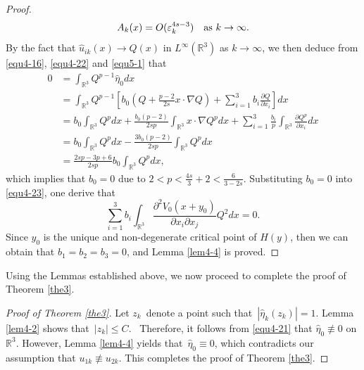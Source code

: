 \documentclass[reqno, 11pt]{amsart} %
\numberwithin{equation}{section}
\begin{document}
\begin{proof}
		\begin{equation*}
			A_{k}(x)=O(\varepsilon_{k}^{4s-3})\quad \hbox{as $k\rightarrow\infty$}.
		\end{equation*}
		By the fact that $\hat{u}_{ik}(x)\rightarrow Q(x)$ in $L^{\infty}(\mathbb{R}^{3})$ as $k\rightarrow\infty$, we then deduce from \eqref{equ4-16}, \eqref{equ4-22} and \eqref{equ5-1} that
		\begin{equation*}
			\begin{split}
				0&=\int_{\mathbb{R}^{3}}Q^{p-1}\hat{\eta}_{0}dx\\
				&=\int_{\mathbb{R}^{3}}Q^{p-1}\left[ b_{0}\left(Q+\frac{p-2}{2s}x\cdot\nabla Q\right)+\sum_{i=1}^{3}b_{i}\frac{\partial Q}{\partial x_{i}}\right] dx\\
				&=b_{0}\int_{\mathbb{R}^{3}}Q^{p}dx+\frac{b_{0}(p-2)}{2sp}\int_{\mathbb{R}^{3}}x\cdot\nabla Q^{p}dx+\sum_{i=1}^{3}\frac{b_{i}}{p}\int_{\mathbb{R}^{3}}\frac{\partial Q^{p}}{\partial x_{i}}dx\\
				&=b_{0}\int_{\mathbb{R}^{3}}Q^{p}dx-\frac{3b_{0}(p-2)}{2sp}\int_{\mathbb{R}^{3}}Q^{p}dx\\
				&=\frac{2sp-3p+6}{2sp}b_{0}\int_{\mathbb{R}^{3}}Q^{p}dx,
			\end{split}
		\end{equation*}
		which implies that $b_{0}=0$ due to $2<p<\frac{4s}{3}+2<\frac{6}{3-2s}$. Substituting $b_{0}=0$ into \eqref{equ4-23}, one derive that
		\begin{equation*}
			\sum^{3}_{i=1}
			b_{i}\int_{\mathbb{R}^{3}}\frac{\partial^{2}V_{0}(x+y_{0})}{\partial x_{i}\partial x_{j}}Q^{2}dx=0.
		\end{equation*}
		Since $y_{0}$ is the unique and non-degenerate critical point of
		$H(y)$, then we can obtain that $b_{1}=b_{2}=b_{3}=0$, and Lemma \ref{lem4-4} is proved.
	\end{proof}
	
	
	Using the Lemmas established above, we now proceed to complete the proof of Theorem \ref{the3}.
	\begin{proof}[Proof of Theorem \ref{the3}] Let \(z_k\) denote a point such that $|\hat{\eta}_k(z_k)| = 1$. Lemma \ref{lem4-2} shows that $|z_k| \leq C$.  Therefore, it follows from \eqref{equ4-21} that $\hat{\eta}_{0}\not\equiv0$ on $\mathbb{R}^{3}$. However, Lemma \ref{lem4-4} yields that $\hat{\eta}_0 \equiv 0$, which contradicts our assumption that $u_{1k}\not\equiv u_{2k}$. This completes the proof of Theorem \ref{the3}.\end{proof}
	
\end{document}
